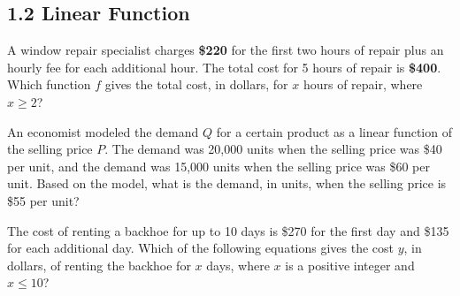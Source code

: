 \subsection*{1.2 Linear Function}
\setcounter{questionnum}{0}


\noindent\markforreview

\vspace{1em}

A window repair specialist charges \textbf{\$220} for the first two hours of repair plus an hourly fee for each additional hour. The total cost for 5 hours of repair is \textbf{\$400}. Which function \( f \) gives the total cost, in dollars, for \( x \) hours of repair, where \( x \geq 2 \)?

\vspace{0.75em}


\vspace{2em}
\noindent\markforreview

\vspace{1em}

An economist modeled the demand \( Q \) for a certain product as a linear function of the selling price \( P \). The demand was 20{,}000 units when the selling price was \$40 per unit, and the demand was 15{,}000 units when the selling price was \$60 per unit. Based on the model, what is the demand, in units, when the selling price is \$55 per unit?

\vspace{0.75em}


\newpage
\noindent\markforreview

\vspace{1em}

The cost of renting a backhoe for up to 10 days is \$270 for the first day and \$135 for each additional day. Which of the following equations gives the cost \( y \), in dollars, of renting the backhoe for \( x \) days, where \( x \) is a positive integer and \( x \leq 10 \)?

\vspace{0.75em}


